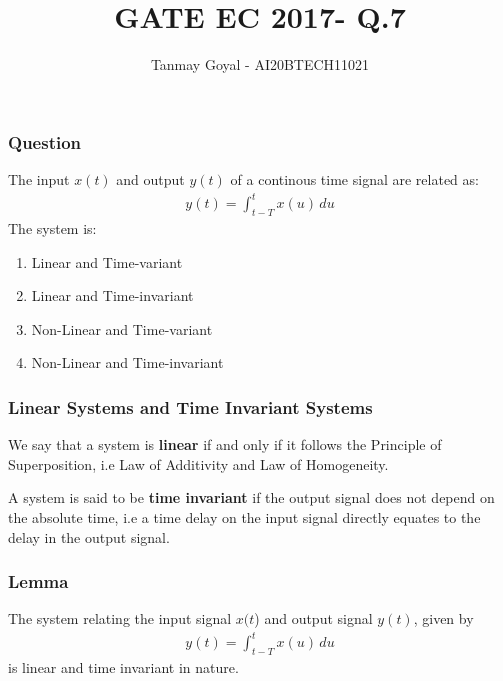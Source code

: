 \documentclass{beamer}
\title{GATE EC 2017- Q.7}
\author{Tanmay Goyal - AI20BTECH11021}
\date{}
\begin{document}
\begin{frame}
\titlepage
\end{frame}
\begin{frame}
\frametitle{Question}
\begin{flushleft}
The input $x(t)$ and output $y(t)$ of a continous time signal are related as:
\begin{align}
    y(t) = \int_{t-T}^tx(u)\,du
\end{align}
The system is:
\begin{enumerate}
    \item Linear and Time-variant
    \item Linear and Time-invariant
    \item Non-Linear and Time-variant
    \item Non-Linear and Time-invariant
\end{enumerate}
\end{flushleft}
\end{frame}

\begin{frame}[fragile]
\frametitle{Linear Systems and Time Invariant Systems}

\begin{flushleft}
\begin{definition}
We say that a system is\textbf{ linear} if and only if it follows the Principle of Superposition, i.e Law of Additivity and Law of Homogeneity.
\label{L}
\end{definition}
          \end{flushleft}
    \begin{flushleft}
    \begin{definition}
A system is said to be \textbf{time invariant} if the output signal does not depend on the absolute time, i.e a time delay on the input signal directly equates to the delay in the output signal.
\label{T}
\end{definition}
\end{flushleft}
\end{frame}


\begin{frame}[fragile]
\frametitle{Lemma}
\begin{flushleft}
\begin{lemma}
The system relating the input signal $x(t$) and output signal $y(t)$, given by 
\begin{align}
     y(t) = \int_{t-T}^tx(u)\,du
\end{align}
is linear and time invariant in nature.
\end{lemma}
\end{flushleft}

\end{frame}
\end{document}
